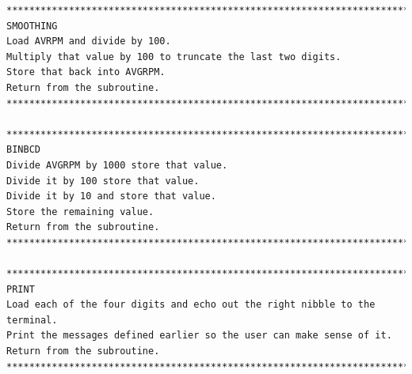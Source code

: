 \documentclass[12pt]{report}
\begin{document}
\begin{Verbatim}[frame=single, fontsize=\footnotesize]
*********************************************************************************
SMOOTHING
Load AVRPM and divide by 100.
Multiply that value by 100 to truncate the last two digits.
Store that back into AVGRPM.
Return from the subroutine.
*********************************************************************************

*********************************************************************************
BINBCD
Divide AVGRPM by 1000 store that value.
Divide it by 100 store that value.
Divide it by 10 and store that value.
Store the remaining value.
Return from the subroutine.
*********************************************************************************

*********************************************************************************
PRINT
Load each of the four digits and echo out the right nibble to the terminal.
Print the messages defined earlier so the user can make sense of it.
Return from the subroutine.
*********************************************************************************
	\end{Verbatim}
\end{document}
